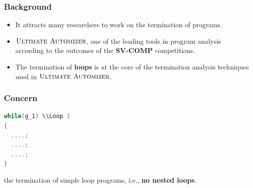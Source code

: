 \begin{frame}
\frametitle{Background}
\begin{itemize}
\item It attracts many researchers to work on the termination of programs.
\item $\textsc{Ultimate Automizer}$, one of the leading tools in program analysis according to the outcomes of the \textbf{\red SV-COMP} competitions.
\item The termination of \textbf{\red loops} is at the core of the termination analysis techniques used in $\textsc{Ultimate Automizer}$.
\end{itemize}
\end{frame}

\begin{frame}[fragile]
\frametitle{Concern}
\begin{minipage}{\linewidth}
\begin{lstlisting}[language=C++,
    xleftmargin=.3\textwidth, 
    xrightmargin=.3\textwidth]
while(g_1) \\Loop 1
{
  ....;
  ....;
  ....;
}
\end{lstlisting}
\end{minipage}
\vfill
\begin{minipage}{\linewidth}
\begin{center}
the termination of simple loop programs, i.e., \textbf{\red no nested loops}. %
\end{center}
\end{minipage}
\end{frame}

